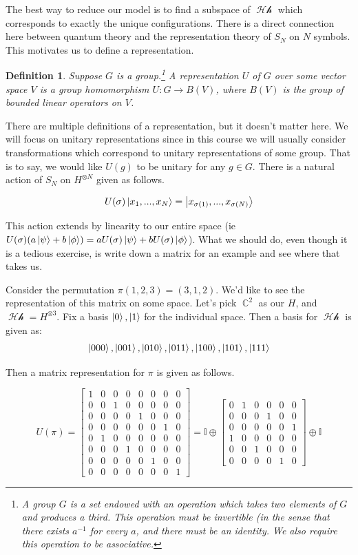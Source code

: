 \documentclass{article}
\DeclareMathOperator{\Hh}{\mathcal{Hh}}
\DeclareMathOperator{\CC}{\mathbb{C}}
\newtheorem{defn}{Definition}
\begin{document}
The best way to reduce our model is to find a subspace of $\Hh$ which corresponds to exactly the unique configurations. There is a direct connection here between quantum theory and the representation theory of $S_N$ on $N$ symbols. This motivates us to define a representation.

\begin{defn}
Suppose $G$ is a group.\footnote{A group $G$ is a set endowed with an operation which takes two elements of $G$ and produces a third. This operation must be invertible (in the sense that there exists $a^{-1}$ for every $a$, and there must be an identity. We also require this operation to be associative.} A representation $U$ of $G$ over some vector space $V$ is a group homomorphism $U:G \to B(V)$, where $B(V)$ is the group of bounded linear operators on $V$.
\end{defn}

There are multiple definitions of a representation, but it doesn't matter here. We will focus on unitary representations since in this course we will usually consider transformations which correspond to unitary representations of some group. That is to say, we would like $U(g)$ to be unitary for any $g \in G$. There is a natural action of $S_N$ on $H^{\otimes N}$ given as follows.

\begin{equation}
U(\sigma)\ket{x_1,...,x_N} = \ket{x_{\sigma(1)},...,x_{\sigma(N)}}
\end{equation}

This action extends by linearity to our entire space (ie $U(\sigma)(a\ket{\psi}+b\ket{\phi}) = aU(\sigma)\ket{\psi}+bU(\sigma)\ket{\phi}$). What we should do, even though it is a tedious exercise, is write down a matrix for an example and see where that takes us.

Consider the permutation $\pi(1,2,3)=(3,1,2)$. We'd like to see the representation of this matrix on some space. Let's pick $\CC^2$ as our $H$, and $\Hh=H^{\otimes 3}$. Fix a basis $\ket{0},\ket{1}$ for the individual space. Then a basis for $\Hh$ is given as:
\[\ket{000},\ket{001},\ket{010},\ket{011},\ket{100},\ket{101},\ket{111}\]

Then a matrix representation for $\pi$ is given as follows.

\[U(\pi) =  \begin{bmatrix}
1&0&0&0&0&0&0&0\\
0&0&1&0&0&0&0&0\\
0&0&0&0&1&0&0&0\\
0&0&0&0&0&0&1&0\\
0&1&0&0&0&0&0&0\\
0&0&0&1&0&0&0&0\\
0&0&0&0&0&1&0&0\\
0&0&0&0&0&0&0&1
		\end{bmatrix}= \mathbb{I}\oplus
\begin{bmatrix}
0&1&0&0&0&0\\
0&0&0&1&0&0\\
0&0&0&0&0&1\\
1&0&0&0&0&0\\
0&0&1&0&0&0\\
0&0&0&0&1&0
\end{bmatrix}\oplus\mathbb{I}\]
\end{document}
